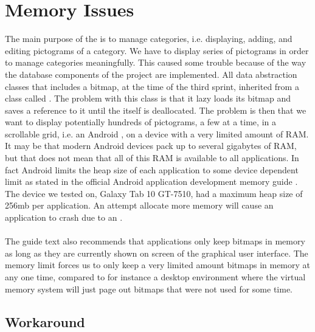 
\section{Memory Issues}
\label{sec:memory_issues}

The main purpose of the \ct is to manage categories, i.e. displaying, adding, and editing pictograms of a category. We have to display series of pictograms in order to manage categories meaningfully. This caused some trouble because of the way the database components of the project are implemented. All data abstraction classes that includes a bitmap, at the time of the third sprint, inherited from a class called . The problem with this class is that it lazy loads its bitmap and saves a reference to it until the  itself is deallocated. The problem is then that we want to display potentially hundreds of pictograms, a few at a time, in a scrollable grid, i.e. an Android , on a device with a very limited amount of RAM. It may be that modern Android devices pack up to several gigabytes of RAM, but that does not mean that all of this RAM is available to all applications. In fact Android limits the heap size of each application to some device dependent limit as stated in the official Android application development memory guide \parencite{android_memory}.
The device we tested on, Galaxy Tab 10 GT-7510, had a maximum heap size of 256mb per application. An attempt allocate more memory will cause an application to crash due to an . 
\\\\
The guide text also recommends that applications only keep bitmaps in memory as long as they are currently shown on screen of the graphical user interface. The memory limit forces us to only keep a very limited amount bitmaps in memory at any one time, compared to for instance a desktop environment where the virtual memory system will just page out bitmaps that were not used for some time.

\subsection{Workaround}
\label{subsec:pictogram_workaround}

